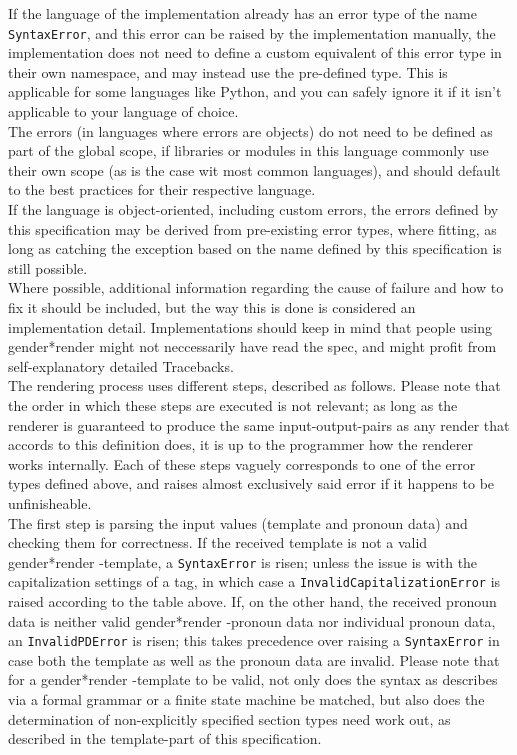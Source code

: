 \documentclass{article}
\newcommand{\GenderRender}{
    gender*render
}
\begin{document}
    If the language of the implementation already has an error type of the name \texttt{SyntaxError}, and this error can be raised by the implementation manually, the implementation does not need to define a custom equivalent of this error type in their own namespace, and may instead use the pre-defined type.
    This is applicable for some languages like Python, and you can safely ignore it if it isn't applicable to your language of choice.\\
    The errors (in languages where errors are objects) do not need to be defined as part of the global scope, if libraries or modules in this language commonly use their own scope (as is the case wit most common languages), and should default to the best practices for their respective language.\\
    If the language is object-oriented, including custom errors, the errors defined by this specification may be derived from pre-existing error types, where fitting, as long as catching the exception based on the name defined by this specification is still possible.\\
    Where possible, additional information regarding the cause of failure and how to fix it should be included, but the way this is done is considered an implementation detail.
    Implementations should keep in mind that people using \GenderRender might not neccessarily have read the spec, and might profit from self-explanatory detailed Tracebacks.\\

    The rendering process uses different steps, described as follows.
    Please note that the order in which these steps are executed is not relevant;
    as long as the renderer is guaranteed to produce the same input-output-pairs as any render that accords to this definition does, it is up to the programmer how the renderer works internally.
    Each of these steps vaguely corresponds to one of the error types defined above, and raises almost exclusively said error if it happens to be unfinisheable.\\

    The first step is parsing the input values (template and pronoun data) and checking them for correctness.
    If the received template is not a valid \GenderRender-template, a \texttt{SyntaxError} is risen;
    unless the issue is with the capitalization settings of a tag, in which case a \texttt{InvalidCapitalizationError} is raised according to the table above.
    If, on the other hand, the received pronoun data is neither valid \GenderRender-pronoun data nor individual pronoun data, an \texttt{InvalidPDError} is risen;
    this takes precedence over raising a \texttt{SyntaxError} in case both the template as well as the pronoun data are invalid.
    Please note that for a \GenderRender-template to be valid, not only does the syntax as describes via a formal grammar or a finite state machine be matched, but also does the determination of non-explicitly specified section types need work out, as described in the template-part of this specification.\\
\end{document}
